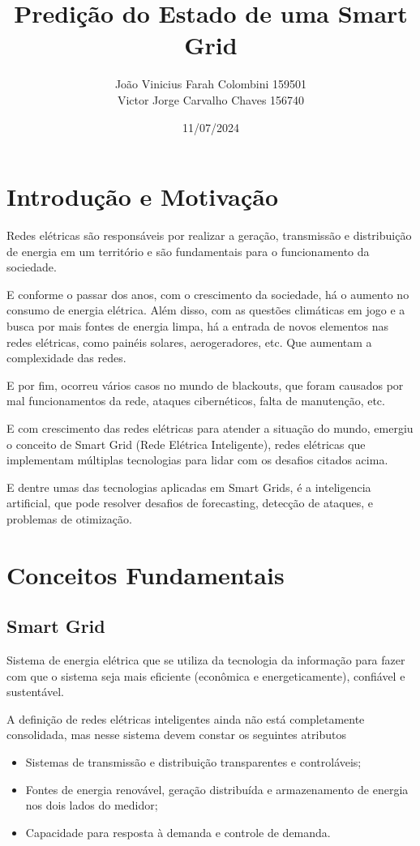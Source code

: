 \documentclass[a4paper,12pt]{article}
\title{Predição do Estado de uma Smart Grid}
\author{João Vinicius Farah Colombini 159501\\
Victor Jorge Carvalho Chaves 156740}
\date{11/07/2024}
\begin{document}
\maketitle

\tableofcontents
\newpage

\section{Introdução e Motivação}

Redes elétricas são responsáveis por realizar a geração,
transmissão e distribuição de energia em um território
e são fundamentais para o funcionamento da sociedade.

E conforme o passar dos anos, com o crescimento da sociedade,
há o aumento no consumo de energia elétrica.
Além disso, com as questões climáticas em jogo e a busca por mais fontes de energia limpa,
há a entrada de novos elementos nas redes elétricas, como painéis solares, aerogeradores, etc. Que aumentam a complexidade das redes.

E por fim, ocorreu vários casos no mundo de blackouts, que foram causados por mal funcionamentos da rede, ataques cibernéticos, falta de manutenção, etc.

E com crescimento das redes elétricas para atender a situação do mundo, emergiu o conceito de Smart Grid (Rede Elétrica Inteligente), redes elétricas que implementam múltiplas tecnologias para lidar com os desafios citados acima.

E dentre umas das tecnologias aplicadas em Smart Grids, é a inteligencia artificial, que pode resolver desafios de forecasting, detecção de ataques, e problemas de otimização.

\section{Conceitos Fundamentais}
\subsection{Smart Grid}
Sistema de energia elétrica que se utiliza da tecnologia da informação para fazer com que o sistema seja mais eficiente (econômica e energeticamente), confiável e sustentável.

A definição de redes elétricas inteligentes ainda não está completamente consolidada, mas nesse sistema devem constar os seguintes atributos

\begin{itemize}
    \item Sistemas de transmissão e distribuição transparentes e controláveis;
    \item Fontes de energia renovável, geração distribuída e armazenamento de energia nos dois lados do medidor;
    \item Capacidade para resposta à demanda e controle de demanda.
\end{itemize}
\end{document}
